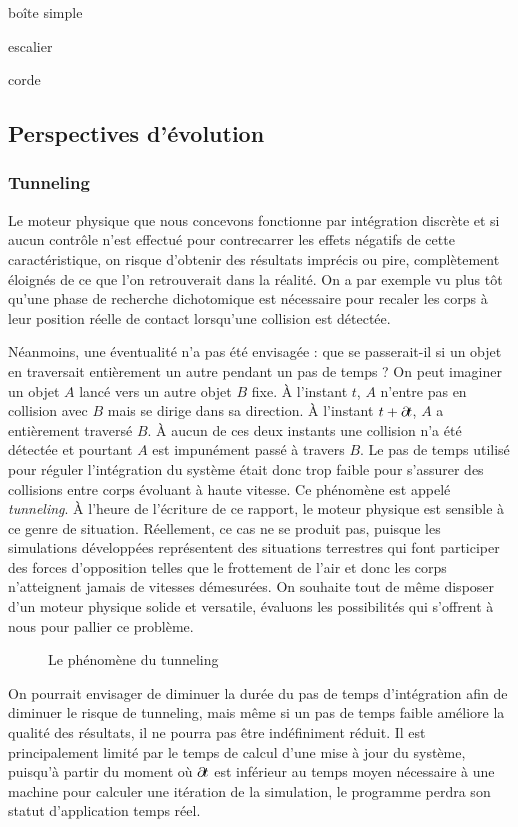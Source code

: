 boîte simple

escalier

corde

\subsection{Perspectives d'évolution}

\subsubsection{Tunneling}

Le moteur physique que nous concevons fonctionne par intégration
discrète et si aucun contrôle n'est effectué pour contrecarrer les
effets négatifs de cette caractéristique, on risque d'obtenir des
résultats imprécis ou pire, complètement éloignés de ce que l'on
retrouverait dans la réalité. On a par exemple vu plus tôt qu'une
phase de recherche dichotomique est nécessaire pour recaler les corps
à leur position réelle de contact lorsqu'une collision est détectée.

Néanmoins, une éventualité n'a pas été envisagée : que se passerait-il
si un objet en traversait entièrement un autre pendant un pas de temps
? On peut imaginer un objet $A$ lancé vers un autre objet $B$
fixe. \`A l'instant $t$, $A$ n'entre pas en collision avec $B$ mais se
dirige dans sa direction. \`A l'instant $t + \partial \! t$, $A$ a
entièrement traversé $B$. \`A aucun de ces deux instants une collision
n'a été détectée et pourtant $A$ est impunément passé à travers
$B$. Le pas de temps utilisé pour réguler l'intégration du système
était donc trop faible pour s'assurer des collisions entre corps
évoluant à haute vitesse. Ce phénomène est appelé
\textit{tunneling}. \`A l'heure de l'écriture de ce rapport, le moteur
physique est sensible à ce genre de situation. Réellement, ce cas ne
se produit pas, puisque les simulations développées représentent des
situations terrestres qui font participer des forces d'opposition
telles que le frottement de l'air et donc les corps n'atteignent
jamais de vitesses démesurées. On souhaite tout de même disposer d'un
moteur physique solide et versatile, évaluons les possibilités qui
s'offrent à nous pour pallier ce problème.
\begin{figure}
  \centering
  
  \caption{Le phénomène du tunneling}
  \label{tunneling1}
\end{figure}

On pourrait envisager de diminuer la durée du pas de temps
d'intégration afin de diminuer le risque de tunneling, mais même si un
pas de temps faible améliore la qualité des résultats, il ne pourra
pas être indéfiniment réduit. Il est principalement limité par le
temps de calcul d'une mise à jour du système, puisqu'à partir du
moment o\`u $\partial \! t$ est inférieur au temps moyen nécessaire à une
machine pour calculer une itération de la simulation, le programme
perdra son statut d'application temps réel.

